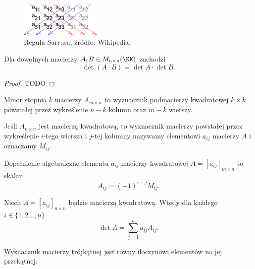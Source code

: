 \begin{figure}[h]
    \centering
    \includegraphics[width=0.35\textwidth]{Sarrus_rule.pdf}
    \caption{Reguła Sarrusa, źródło: Wikipedia.}
\end{figure}

\begin{theorem}
    \label{t:det is multiplicative}
    Dla dowolnych macierzy $A, B \in M_{n\times n}(\KK)$ zachodzi
    \[ \det(A\cdot B) = \det A \cdot \det B. \]
\end{theorem}
\begin{proof}
    TODO
\end{proof}

\begin{definition}
    Minor stopnia $k$ macierzy $A_{m\times n}$ to wyznacznik podmacierzy kwadratowej $k\times k$ powstałej przez wykreślenie $n-k$ kolumn oraz $m-k$ wierszy.
\end{definition}

Jeśli $A_{n\times n}$ jest macierzą kwadratową, to wyznacznik macierzy powstałej przez wykreślenie $i$-tego wiersza i $j$-tej kolumny nazywamy  elementowi $a_{ij}$ macierzy $A$ i oznaczamy $M_{ij}$.

\begin{definition}
    Dopełnienie algebraiczne elementu $a_{ij}$ macierzy kwadratowej $A = [a_{ij}]_{m\times n}$ to skalar
    \[ A_{ij} = (-1)^{i+j}M_{ij}. \]
\end{definition}

\begin{theorem}[Laplace'a]
    \label{t:Laplace}
    Niech $A = [a_{ij}]_{n\times n}$ będzie macierzą kwadratową. Wtedy dla każdego $i \in \{1,2\ldots,n\}$ 
    \[ \det A = \sum_{j=1}^n a_{ij}A_{ij}. \]
\end{theorem}

\begin{corollary}
    \label{c:determinant in triangular matrix}
    Wyznacznik macierzy trójkątnej jest równy iloczynowi elementów na jej przekątnej.
\end{corollary}